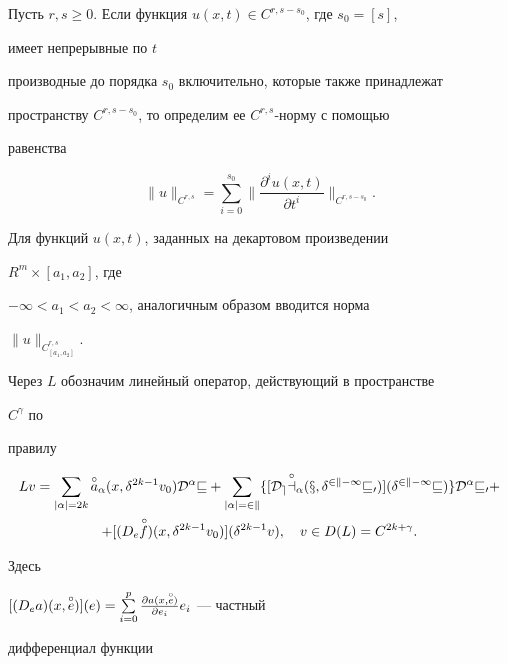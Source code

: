 Пусть $r,s\ge0$. Если функция $u(x,t)\in C^{r,s-s_0}$, где $s_0=[s]$, 


имеет непрерывные по $t$ 


производные до порядка $s_0$ включительно, которые также принадлежат 


пространству $C^{r,s-s_0}$, то определим ее $C^{r,s}$-норму с помощью 


равенства 


$$ 


\|u\|_{C^{r,s}}=\sum^{s_0}_{i=0}\bigg\| 


\frac{\partial^i u(x,t)}{\partial t^i}\bigg\|_{C^{r,s-s_0}}. 


$$ 


 


Для функций $u(x,t)$, заданных на декартовом произведении 


$R^m\times[a_1,a_2]$, где 


$-\infty<a_1<a_2<\infty$, аналогичным образом вводится норма 


$\|u\|_{C^{r,s}_{[a_1,a_2]}}$. 


 


Через $L$ обозначим линейный оператор, действующий в пространстве 


$C^\gamma$ по 


правилу 


\begin{multline*} 


L v=\sum_{|\alpha|=2k}\up{\circ}{a}_\alpha(x,\delta^{2k-1}v_0) 


\cal D^\alpha v+\sum_{|\alpha|=2k}\{[D_e\up{\circ}{a}_\alpha 


(x,\delta^{2k-1}v_0)](\delta^{2k-1}v)\} 


\cal D^\alpha v_0+ \\ 


% 


+[(D_e\up{\,\circ}{f})(x,\delta^{2k-1}v_0)] 


(\delta^{2k-1}v),\quad v\in D(L)=C^{2k+\gamma}. 


\end{multline*} 


Здесь 


$[(D_e a)(x,\up{\circ}{e})](e)=\sum\limits^p_{i=0} 


\frac{\partial a(x,\up{\circ}{e})}{\partial e_i}e_i$ --- частный 


дифференциал функции 


